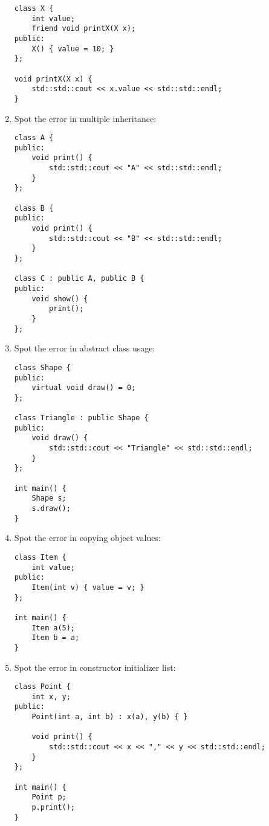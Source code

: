 \documentclass[a4paper,12pt]{article}
\begin{document}
\begin{enumerate}
\begin{lstlisting}
class X {
    int value;
    friend void printX(X x);
public:
    X() { value = 10; }
};

void printX(X x) {
    std::std::cout << x.value << std::std::endl;
}
\end{lstlisting}

    \item Spot the error in multiple inheritance:
\begin{lstlisting}
class A {
public:
    void print() {
        std::std::cout << "A" << std::std::endl;
    }
};

class B {
public:
    void print() {
        std::std::cout << "B" << std::std::endl;
    }
};

class C : public A, public B {
public:
    void show() {
        print();
    }
};
\end{lstlisting}

    \item Spot the error in abstract class usage:
\begin{lstlisting}
class Shape {
public:
    virtual void draw() = 0;
};

class Triangle : public Shape {
public:
    void draw() {
        std::std::cout << "Triangle" << std::std::endl;
    }
};

int main() {
    Shape s;
    s.draw();
}
\end{lstlisting}

    \item Spot the error in copying object values:
\begin{lstlisting}
class Item {
    int value;
public:
    Item(int v) { value = v; }
};

int main() {
    Item a(5);
    Item b = a;
}
\end{lstlisting}

    \item Spot the error in constructor initializer list:
\begin{lstlisting}
class Point {
    int x, y;
public:
    Point(int a, int b) : x(a), y(b) { }

    void print() {
        std::std::cout << x << "," << y << std::std::endl;
    }
};

int main() {
    Point p;
    p.print();
}
\end{lstlisting}
\end{enumerate}
\end{document}
